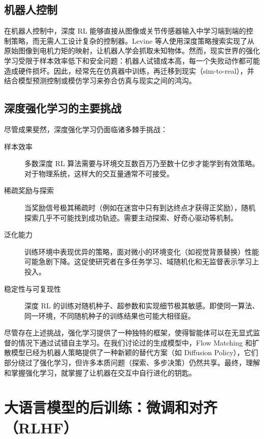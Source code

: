 \subsection{机器人控制}

在机器人控制中，深度 RL 能够直接从图像或关节传感器输入中学习端到端的控制策略，而无需人工设计复杂的控制器。Levine 等人使用深度策略搜索实现了从原始图像到电机力矩的映射，让机器人学会抓取未知物体\cite{levine2018reinforcementlearningcontrolprobabilistic}。然而，现实世界的强化学习受限于样本效率低下和安全问题：机器人试错成本高，每一个失败动作都可能造成硬件损坏。因此，经常先在仿真器中训练，再迁移到现实（sim-to-real），并结合模型预测控制或模仿学习来弥合仿真与现实之间的鸿沟。

\subsection{深度强化学习的主要挑战}

尽管成果斐然，深度强化学习仍面临诸多棘手挑战：
\begin{description}
\item[样本效率] 多数深度 RL 算法需要与环境交互数百万乃至数十亿步才能学到有效策略。对于物理系统，这样大的交互量通常不可接受。
\item[稀疏奖励与探索] 当奖励信号极其稀疏时（例如在迷宫中只有到达终点才获得正奖励），随机探索几乎不可能找到成功轨迹。需要主动探索、好奇心驱动等机制\cite{pathak2017curiositydrivenexplorationselfsupervisedprediction}。
\item[泛化能力] 训练环境中表现优异的策略，面对微小的环境变化（如视觉背景替换）性能可能急剧下降。这促使研究者在多任务学习、域随机化和无监督表示学习上投入。
\item[稳定性与可复现性] 深度 RL 的训练对随机种子、超参数和实现细节极其敏感。即使同一算法、同一环境，不同随机种子的训练结果也可能大相径庭\cite{Fran_ois_Lavet_2018}。
\end{description}

尽管存在上述挑战，强化学习提供了一种独特的框架，使得智能体可以在无显式监督的情况下通过试错自主学习。在我们讨论过的生成模型中，Flow Matching 和扩散模型已经为机器人策略提供了一种新颖的替代方案（如 Diffusion Policy），它们部分绕过了强化学习，但许多本质问题（探索、多步决策）仍然共享。最终，理解和掌握强化学习，就掌握了让机器在交互中自行进化的钥匙。

\section{大语言模型的后训练：微调和对齐（RLHF）}


